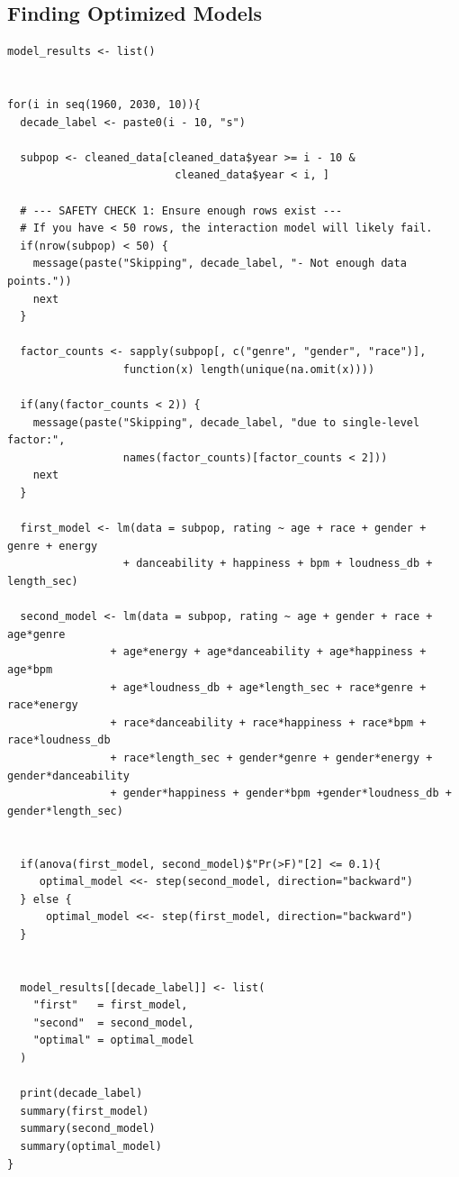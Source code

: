 \documentclass[11pt]{article}
\begin{document}
\subsection{Finding Optimized Models}
\begin{verbatim}
model_results <- list()


for(i in seq(1960, 2030, 10)){
  decade_label <- paste0(i - 10, "s")

  subpop <- cleaned_data[cleaned_data$year >= i - 10 & 
                          cleaned_data$year < i, ]
  
  # --- SAFETY CHECK 1: Ensure enough rows exist ---
  # If you have < 50 rows, the interaction model will likely fail.
  if(nrow(subpop) < 50) {
    message(paste("Skipping", decade_label, "- Not enough data points."))
    next
  }
  
  factor_counts <- sapply(subpop[, c("genre", "gender", "race")], 
                  function(x) length(unique(na.omit(x))))
  
  if(any(factor_counts < 2)) {
    message(paste("Skipping", decade_label, "due to single-level factor:", 
                  names(factor_counts)[factor_counts < 2]))
    next
  }
  
  first_model <- lm(data = subpop, rating ~ age + race + gender + genre + energy 
                  + danceability + happiness + bpm + loudness_db + length_sec)

  second_model <- lm(data = subpop, rating ~ age + gender + race + age*genre 
                + age*energy + age*danceability + age*happiness + age*bpm 
                + age*loudness_db + age*length_sec + race*genre + race*energy 
                + race*danceability + race*happiness + race*bpm + race*loudness_db 
                + race*length_sec + gender*genre + gender*energy + gender*danceability 
                + gender*happiness + gender*bpm +gender*loudness_db + gender*length_sec)
  

  if(anova(first_model, second_model)$"Pr(>F)"[2] <= 0.1){
     optimal_model <<- step(second_model, direction="backward")
  } else {
      optimal_model <<- step(first_model, direction="backward")
  }
  
  
  model_results[[decade_label]] <- list(
    "first"   = first_model,
    "second"  = second_model,
    "optimal" = optimal_model
  )
  
  print(decade_label)
  summary(first_model)
  summary(second_model)
  summary(optimal_model)
}
\end{verbatim}
\end{document}
